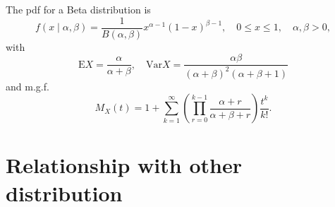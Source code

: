 \documentclass[a4paper,12pt]{article}
\begin{document}
The pdf for a Beta distribution is
\begin{equation}
  \label{eq:beta_pdf}
  f\left(x\middle|\alpha, \beta\right) =
  \frac{1}{B\left(\alpha, \beta\right)}
  x^{\alpha - 1}\left(1 - x\right)^{\beta - 1}
  ,\quad
  0 \leq x \leq 1
  ,\quad
  \alpha, \beta > 0
  ,
\end{equation}
with
\[
  \mathrm{E}X = \frac{\alpha}{\alpha + \beta}
  ,\quad
  \mathrm{Var} X = \frac{\alpha\beta}{\left(\alpha + \beta\right)^2\left(\alpha + \beta + 1\right)}
\]
and m.g.f.
\[
  M_X\left(t\right) =
  1 + \sum\limits_{k = 1}^{\infty}\left(
    \prod\limits_{r = 0}^{k - 1}\frac{\alpha + r}{\alpha + \beta + r}
  \right)
  \frac{t^k}{k!}
  .
\]
\section{Relationship with other distribution}
\label{sec:relat-other-distr}
\end{document}
